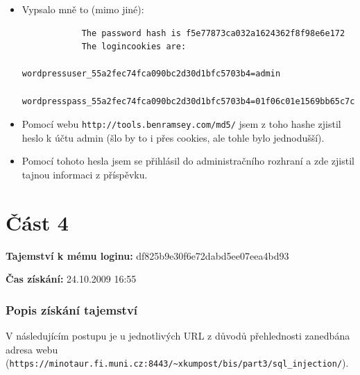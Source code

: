 \documentclass[a4paper,10pt]{article}
\begin{document}
\begin{itemize}
	\item Vypsalo mně to (mimo jiné):
		\begin{verbatim}
			The password hash is f5e77873ca032a1624362f8f98e6e172
			The logincookies are:
				wordpressuser_55a2fec74fca090bc2d30d1bfc5703b4=admin
				wordpresspass_55a2fec74fca090bc2d30d1bfc5703b4=01f06c01e1569bb65c7c37955aa7722d
		\end{verbatim}

	\item Pomocí webu \verb!http://tools.benramsey.com/md5/! jsem z toho hashe zjistil heslo k účtu admin (šlo by to i přes cookies, ale tohle bylo jednodušší).

	\item Pomocí tohoto hesla jsem se přihlásil do administračního rozhraní a zde zjistil tajnou informaci z příspěvku.
\end{itemize}

\section*{Část 4}

\textbf{Tajemství k mému loginu:} df825b9e30f6e72dabd5ee07eea4bd93

\textbf{Čas získání:} 24.10.2009 16:55

\subsubsection*{Popis získání tajemství}

V následujícím postupu je u jednotlivých URL z důvodů přehlednosti zanedbána adresa webu (\verb!https://minotaur.fi.muni.cz:8443/~xkumpost/bis/part3/sql_injection/!).
\end{document}

